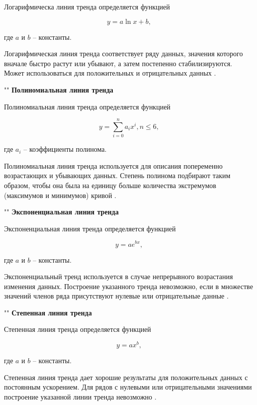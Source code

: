 \documentclass[a4paper]{bmstu}
\begin{document}
Логарифмическа линия тренда определяется функцией

\begin{equation}
	y = a\ln x + b,
\end{equation}

где $a$ и $b$ -- константы.

Логарифмическая линия тренда соответствует ряду данных, значения которого вначале быстро растут или убывают, а затем постепенно стабилизируются. Может использоваться для положительных и отрицательных данных \cite{lt-exel}.

""\newline
\noindent\textbf{Полиномиальная линия тренда}

Полиномиальная линия тренда определяется функцией

\begin{equation}
	y = \sum_{i = 0}^{n} a_i x^i, n \leqslant 6,
\end{equation}

где $a_i$ -- коэффициенты полинома.

Полиномиальная линия тренда используется для описания попеременно возрастающих и убывающих данных. Степень полинома подбирают таким образом, чтобы она была на единицу больше количества экстремумов (максимумов и минимумов) кривой \cite{lt-exel}.

""\newline
\noindent\textbf{Экспоненциальная линия тренда}

Экспоненциальная линия тренда определяется функцией

\begin{equation}
	y = a e ^ {bx},
\end{equation}

где $a$ и $b$ -- константы.

Экспоненциальный тренд используется в случае непрерывного возрастания изменения данных. Построение указанного тренда не­возможно, если в множестве значений членов ряда присутствуют нулевые или отрицательные данные \cite{lt-exel}.

""\newline
\noindent\textbf{Степенная линия тренда}

Степенная линия тренда определяется функцией

\begin{equation}
	y = a x ^ b,
\end{equation}

где $a$ и $b$ -- константы.

Степенная линия тренда дает хорошие результаты для положительных данных с постоянным ускорением. Для рядов с нулевыми или отрицательными значениями построение указанной линии трен­да невозможно \cite{lt-exel}.
\end{document}

